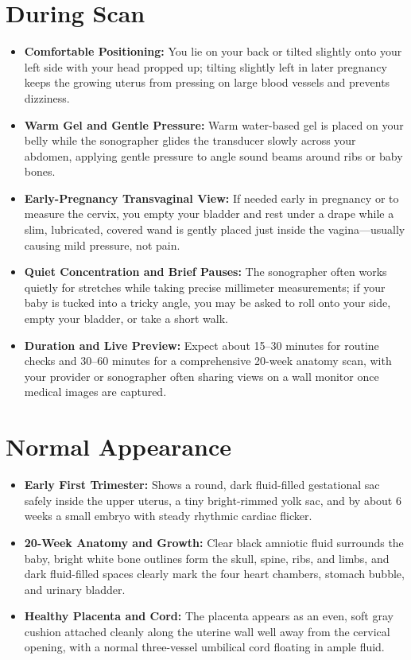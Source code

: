 \section{During Scan}
\begin{itemize}
\item \textbf{Comfortable Positioning:} You lie on your back or tilted slightly onto your left side with your head propped up; tilting slightly left in later pregnancy keeps the growing uterus from pressing on large blood vessels and prevents dizziness.
\item \textbf{Warm Gel and Gentle Pressure:} Warm water-based gel is placed on your belly while the sonographer glides the transducer slowly across your abdomen, applying gentle pressure to angle sound beams around ribs or baby bones.
\item \textbf{Early-Pregnancy Transvaginal View:} If needed early in pregnancy or to measure the cervix, you empty your bladder and rest under a drape while a slim, lubricated, covered wand is gently placed just inside the vagina---usually causing mild pressure, not pain.
\item \textbf{Quiet Concentration and Brief Pauses:} The sonographer often works quietly for stretches while taking precise millimeter measurements; if your baby is tucked into a tricky angle, you may be asked to roll onto your side, empty your bladder, or take a short walk.
\item \textbf{Duration and Live Preview:} Expect about 15--30 minutes for routine checks and 30--60 minutes for a comprehensive 20-week anatomy scan, with your provider or sonographer often sharing views on a wall monitor once medical images are captured.
\end{itemize}

\section{Normal Appearance}
\begin{itemize}
\item \textbf{Early First Trimester:} Shows a round, dark fluid-filled gestational sac safely inside the upper uterus, a tiny bright-rimmed yolk sac, and by about 6 weeks a small embryo with steady rhythmic cardiac flicker.
\item \textbf{20-Week Anatomy and Growth:} Clear black amniotic fluid surrounds the baby, bright white bone outlines form the skull, spine, ribs, and limbs, and dark fluid-filled spaces clearly mark the four heart chambers, stomach bubble, and urinary bladder.
\item \textbf{Healthy Placenta and Cord:} The placenta appears as an even, soft gray cushion attached cleanly along the uterine wall well away from the cervical opening, with a normal three-vessel umbilical cord floating in ample fluid.
\end{itemize}

